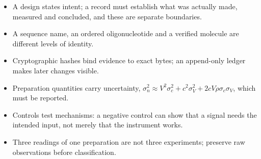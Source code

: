 \begin{KeyIdeas}
\begin{itemize}\setlength{\itemsep}{2pt}
\item A design states intent; a record must establish what was actually made,
measured and concluded, and these are separate boundaries.
\item A sequence name, an ordered oligonucleotide and a verified molecule are
different levels of identity.
\item Cryptographic hashes bind evidence to exact bytes; an append-only ledger
makes later changes visible.
\item Preparation quantities carry uncertainty, $\sigma_n^2\approx V^2\sigma_c^2+c^2\sigma_V^2+2cV\rho\sigma_c\sigma_V$, which must be reported.
\item Controls test mechanisms: a negative control can show that a signal needs the
intended input, not merely that the instrument works.
\item Three readings of one preparation are not three experiments; preserve raw
observations before classification.
\end{itemize}
\end{KeyIdeas}

